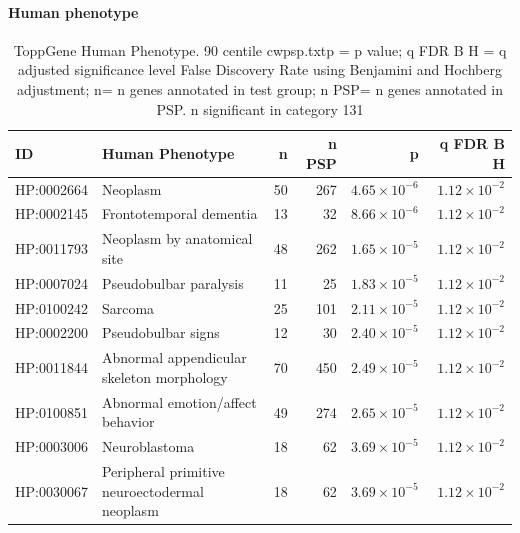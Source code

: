 \paragraph{Human phenotype}

\begin{table}[ht]
\centering
\begin{adjustbox}{width=\textwidth}
\begin{tabular}{llrrrr}
  \hline
ID & Human Phenotype & n & n PSP & p & q FDR B H \\ 
  \hline
HP:0002664 & Neoplasm & 50 & 267 & $4.65 \times 10^{-6}$ & $1.12 \times 10^{-2}$ \\ 
  HP:0002145 & Frontotemporal dementia & 13 & 32 & $8.66 \times 10^{-6}$ & $1.12 \times 10^{-2}$ \\ 
  HP:0011793 & Neoplasm by anatomical site & 48 & 262 & $1.65 \times 10^{-5}$ & $1.12 \times 10^{-2}$ \\ 
  HP:0007024 & Pseudobulbar paralysis & 11 & 25 & $1.83 \times 10^{-5}$ & $1.12 \times 10^{-2}$ \\ 
  HP:0100242 & Sarcoma & 25 & 101 & $2.11 \times 10^{-5}$ & $1.12 \times 10^{-2}$ \\ 
  HP:0002200 & Pseudobulbar signs & 12 & 30 & $2.40 \times 10^{-5}$ & $1.12 \times 10^{-2}$ \\ 
  HP:0011844 & Abnormal appendicular skeleton morphology & 70 & 450 & $2.49 \times 10^{-5}$ & $1.12 \times 10^{-2}$ \\ 
  HP:0100851 & Abnormal emotion/affect behavior & 49 & 274 & $2.65 \times 10^{-5}$ & $1.12 \times 10^{-2}$ \\ 
  HP:0003006 & Neuroblastoma & 18 & 62 & $3.69 \times 10^{-5}$ & $1.12 \times 10^{-2}$ \\ 
  HP:0030067 & Peripheral primitive neuroectodermal neoplasm & 18 & 62 & $3.69 \times 10^{-5}$ & $1.12 \times 10^{-2}$ \\ 
   \hline
\end{tabular}
\end{adjustbox}
\caption{ToppGene Human Phenotype. 90 centile cwpsp.txtp = p value; q FDR B H = q adjusted significance level False Discovery Rate using Benjamini and Hochberg adjustment; n= n genes annotated in test group; n PSP= n genes annotated in PSP. n significant in category 131} 
\label{tab:ToppGENE Human Phenotype. 90 centile cwpsp.txtp = p value; q FDR B H = q adjusted significance level False Discovery Rate using Benjamini and Hochberg adjustment; n= n genes annotated in test group; n PSP= n genes annotated in PSP. n significant in category 131}
\end{table}

